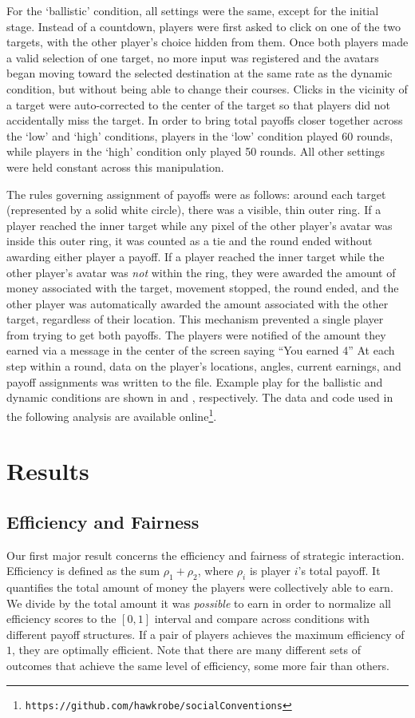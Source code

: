 \documentclass[10pt,letterpaper]{article}
\begin{document}
For the `ballistic' condition, all settings were the same, except for the initial stage. Instead of a countdown, players were first asked to click on one of the two targets, with the other player's choice hidden from them. Once both players made a valid selection of one target, no more input was registered and the avatars began moving toward the selected destination at the same rate as the dynamic condition, but without being able to change their courses. Clicks in the vicinity of a target were auto-corrected to the center of the target so that players did not accidentally miss the target. In order to bring total payoffs closer together across the `low' and `high' conditions, players in the `low' condition played 60 rounds, while players in the `high' condition only played 50 rounds. All other settings were held constant across this manipulation. 

The rules governing assignment of payoffs were as follows: around each target (represented by a solid white circle), there was a visible, thin outer ring. If a player reached the inner target while any pixel of the other player's avatar was inside this outer ring, it was counted as a tie and the round ended without awarding either player a payoff. If a player reached the inner target while the other player's avatar was \emph{not} within the ring, they were awarded the amount of money associated with the target, movement stopped, the round ended, and the other player was automatically awarded the amount associated with the other target, regardless of their location. This mechanism prevented a single player from trying to get both payoffs. The players were notified of the amount they earned via a message in the center of the screen saying ``You earned 4\textcent [2\textcent]'' At each step within a round, data on the player's locations, angles, current earnings, and payoff assignments was written to the file. Example play for the ballistic and dynamic conditions are shown in  and , respectively. The data and code used in the following analysis are available online\footnote{\texttt{https://github.com/hawkrobe/socialConventions}}.

\section*{Results}

\subsection*{Efficiency and Fairness} Our first major result concerns the efficiency and fairness of strategic interaction. Efficiency is defined as the sum $\rho_1 + \rho_2$, where $\rho_i$ is player $i$'s total payoff. It quantifies the total amount of money the players were collectively able to earn. We divide by the total amount it was \emph{possible} to earn in order to normalize all efficiency scores to the $[0,1]$ interval and compare across conditions with different payoff structures. If a pair of players achieves the maximum efficiency of $1$, they are optimally efficient. Note that there are many different sets of outcomes that achieve the same level of efficiency, some more fair than others.
\end{document}
